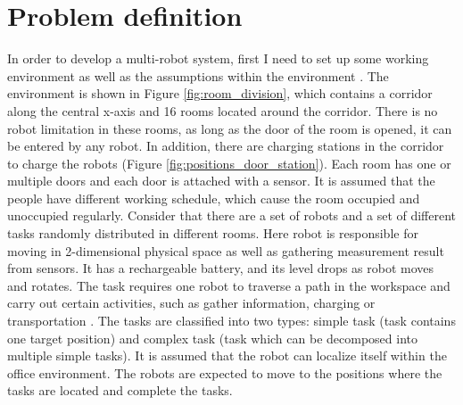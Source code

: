 


\section{Problem definition}
In order to develop a multi-robot system, first I need to set up some working environment as well as the assumptions within the environment \cite{Shah7}. The environment is shown in Figure \ref{fig:room_division}, which contains a corridor along the central x-axis and 16 rooms located around the corridor. There is no robot limitation in these rooms, as long as the door of the room is opened, it can be entered by any robot. In addition, there are charging stations in the corridor to charge the robots (Figure \ref{fig:positions_door_station}). Each room has one or multiple doors and each door is attached with a sensor. It is assumed that the people have different working schedule, which cause the room occupied and unoccupied regularly.
Consider that there are a set of robots and a set of different tasks randomly distributed in different rooms. 
Here robot is responsible for moving in 2-dimensional physical space as well as gathering measurement result from sensors. It has a rechargeable battery, and its level drops as robot moves and rotates.
The task requires one robot to traverse a path in the workspace and carry out certain activities, such as gather information, charging or transportation \cite{Ivan2017}. The tasks are classified into two types: simple task (task contains one target position) and complex task (task which can be decomposed into multiple simple tasks). It is assumed that the robot can localize itself within the office environment. The robots are expected to move to the positions where the tasks are located and complete the tasks. 

